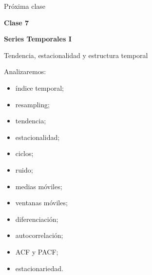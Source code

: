 \documentclass[aspectratio=169,11pt]{beamer}
\begin{document}
\begin{frame}{Próxima clase}

\begin{center}

{\Huge
\textbf{Clase 7}
}

\vspace{0.4cm}

{\LARGE
\textcolor{azulmarista}{
\textbf{Series Temporales I}
}
}

\vspace{0.3cm}

{\Large
Tendencia, estacionalidad y estructura temporal
}

\end{center}

\vspace{0.5cm}

Analizaremos:

\begin{itemize}

    \item índice temporal;

    \item resampling;

    \item tendencia;

    \item estacionalidad;

    \item ciclos;

    \item ruido;

    \item medias móviles;

    \item ventanas móviles;

    \item diferenciación;

    \item autocorrelación;

    \item ACF y PACF;

    \item estacionariedad.

\end{itemize}

\end{frame}

\end{document}

